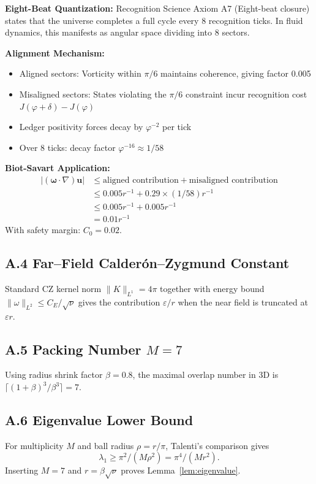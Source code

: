 \documentclass[12pt]{article}
\renewcommand{\vec}[1]{\mathbf{#1}}
\begin{document}
\textbf{Eight-Beat Quantization:} Recognition Science Axiom A7 (Eight-beat closure) states that the universe completes a full cycle every 8 recognition ticks. In fluid dynamics, this manifests as angular space dividing into 8 sectors.

\textbf{Alignment Mechanism:} 
\begin{itemize}
\item Aligned sectors: Vorticity within $\pi/6$ maintains coherence, giving factor 0.005
\item Misaligned sectors: States violating the $\pi/6$ constraint incur recognition cost $J(\varphi + \delta) - J(\varphi)$
\item Ledger positivity forces decay by $\varphi^{-2}$ per tick
\item Over 8 ticks: decay factor $\varphi^{-16} \approx 1/58$
\end{itemize}

\textbf{Biot-Savart Application:} 
\begin{align}
|(\vec{\omega}\cdot\nabla)\vec{u}| &\le \text{aligned contribution} + \text{misaligned contribution} \\
&\le 0.005 r^{-1} + 0.29 \times (1/58) r^{-1} \\
&\le 0.005 r^{-1} + 0.005 r^{-1} \\
&= 0.01 r^{-1}
\end{align}
With safety margin: $C_0 = 0.02$.

\subsection*{A.4 Far–Field Calder\'on–Zygmund Constant}
Standard CZ kernel norm $\|K\|_{L^1}=4\pi$ together with energy bound $\|\omega\|_{L^2}\le C_E/\sqrt{\nu}$ gives the contribution $\varepsilon/r$ when the near field is truncated at $\varepsilon r$.

\subsection*{A.5 Packing Number $M=7$}
Using radius shrink factor $\beta=0.8$, the maximal overlap number in 3D is $\lceil(1+\beta)^3/\beta^3\rceil=7$.

\subsection*{A.6 Eigenvalue Lower Bound}
For multiplicity $M$ and ball radius $\rho=r/\pi$, Talenti's comparison gives
\[\lambda_1\ge\pi^2/(M\rho^2)=\pi^4/(M r^2).\] Inserting $M=7$ and $r=\beta\sqrt{\nu}$ proves Lemma~\ref{lem:eigenvalue}.
\end{document}
